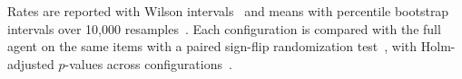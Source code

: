 Rates are reported with Wilson intervals~\cite{wilson1927} and means with percentile bootstrap intervals over 10{,}000 resamples~\cite{efron1993bootstrap}. Each configuration is compared with the full agent on the same items with a paired sign-flip randomization test~\cite{smucker2007significance}, with Holm-adjusted $p$-values across configurations~\cite{holm1979}.

